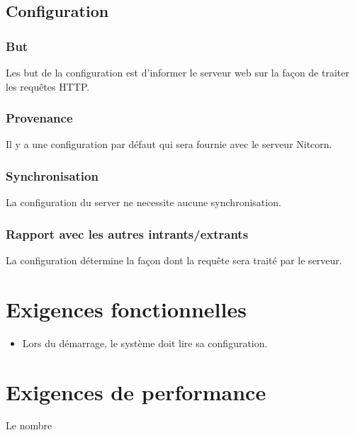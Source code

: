 \documentclass{scrreprt}
\begin{document}
\subsection{Configuration}
\subsubsection{But} Les but de la configuration est d'informer le serveur web sur la façon de traiter les requêtes HTTP.
\subsubsection{Provenance} Il y a une configuration par défaut qui sera fournie avec le serveur Nitcorn. 
\subsubsection{Synchronisation} La configuration du server ne necessite aucune synchronisation.
\subsubsection{Rapport avec les autres intrants/extrants} La configuration détermine la façon dont la requête sera traité par le serveur.
\section{Exigences fonctionnelles}
\begin{itemize}
    \item Lors du démarrage, le système doit lire sa configuration.
\end{itemize}
\section{Exigences de performance} Le nombre 
\end{document}
